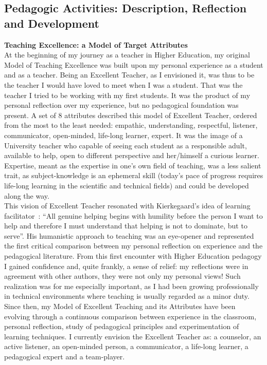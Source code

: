 \documentclass[
  a4paper, 
]{fortysecondscv}
\begin{document}
\subsection{Pedagogic Activities: Description, Reflection and Development}
\textbf{Teaching Excellence: a Model of Target Attributes}\\[6pt]
At the beginning of my journey as a teacher in Higher Education, my original Model of Teaching Excellence was built upon my personal experience as a student and as a teacher. Being an Excellent Teacher, as I envisioned it, was thus to be the teacher I would have loved to meet when I was a student. That was the teacher I tried to be working with my first students. It was the product of my personal reflection over my experience, but no pedagogical foundation was present. A set of 8 attributes described this model of Excellent Teacher, ordered from the most to the least needed: empathic, understanding, respectful, listener, communicator, open-minded, life-long learner, expert. It was the image of a University teacher who capable of seeing each student as a responsible adult, available to help, open to different perspective and her/himself a curious learner. Expertise, meant as the expertise in one’s own field of teaching, was a less salient trait, as subject-knowledge is an ephemeral skill (today's pace of progress requires life-long learning in the scientific and technical fields) and could be developed along the way.\\
This vision of Excellent Teacher resonated with Kierkegaard’s idea of learning facilitator~\cite{kierkegaard1859,kierkegaard1998}: “All genuine helping begins with humility before the person I want to help and therefore I must understand that helping is not to dominate, but to serve”.  His humanistic approach to teaching was an eye-opener and represented the first critical comparison between my personal reflection on experience and the pedagogical literature. From this first encounter with Higher Education pedagogy I gained confidence and, quite frankly, a sense of relief: my reflections were in agreement with other authors, they were not only my personal views! Such realization was for me especially important, as I had been growing professionally in technical environments where teaching is usually regarded as a minor duty.\\
Since then, my Model of Excellent Teaching and its Attributes have been evolving through a continuous comparison between experience in the classroom, personal reflection, study of pedagogical principles and experimentation of learning techniques. I currently envision the Excellent Teacher as: a counselor, an active listener, an open-minded person, a communicator, a life-long learner, a pedagogical expert and a team-player.\\
\end{document}

